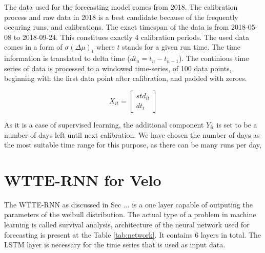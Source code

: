 
The data used for the forecasting model comes from 2018. The calibration process and raw data in 2018 is a best candidate because of the frequently occuring runs, and calibrations. The exact timespan of the data is from 2018-05-08 to 2018-09-24.
This constitues exactly 4 calibration periods. The used data comes in a form of $\sigma(\Delta\mu)_{t}$ where $t$ stands for a given run time.
The time information is translated to delta time ($dt_{n} = t_{n}-t_{n-1}$). The continious time series of data is processed to a windowed time-series, of 100 data points, beginning with the first data point after calibration, and padded with zeroes.

%

\begin{equation}
X_{it} = \begin{bmatrix} std_{it} \\ dt_{t} \end{bmatrix}
\end{equation}

As it is a case of supervised learning, the additional component $Y_{it}$ is set to be a number of days left until next calibration. We have chosen the number of days as the most suitable time range for this purpose, as there can be many runs per day,


\section{WTTE-RNN for Velo}



The WTTE-RNN as discussed in Sec ... is a one layer capable of outputing the parameters of the weibull distribution. The actual type of a problem in machine learning is called survival analysis, architecture of the neural network used for forecasting is present at the Table \ref{tab:network}. It contains 6 layers in total. The LSTM layer is necessary for the time series that is used as input data.

